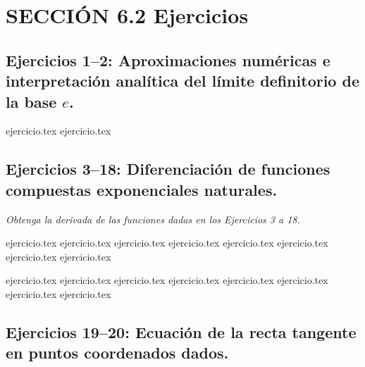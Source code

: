 
\section*{SECCIÓN 6.2 \quad Ejercicios}

\subsection*{Ejercicios 1--2: Aproximaciones numéricas e interpretación analítica del límite definitorio de la base $e$.}

\begin{enumerate}
    {ejercicio.tex}
    {ejercicio.tex}
\end{enumerate}

\subsection*{Ejercicios 3--18: Diferenciación de funciones compuestas exponenciales naturales.}

\noindent \textit{Obtenga la derivada de las funciones dadas en los Ejercicios 3 a 18.}

\begin{enumerate}
    \setcounter{enumi}{2}
    \begin{minipage}{0.45\textwidth}
    {ejercicio.tex}
    {ejercicio.tex}
    {ejercicio.tex}
    {ejercicio.tex}
    {ejercicio.tex}
    {ejercicio.tex}
    {ejercicio.tex}
    {ejercicio.tex}
    \end{minipage}%
    \begin{minipage}{0.45\textwidth}
    {ejercicio.tex}
    {ejercicio.tex}
    {ejercicio.tex}
    {ejercicio.tex}
    {ejercicio.tex}
    {ejercicio.tex}
    {ejercicio.tex}
    {ejercicio.tex}
    \end{minipage}
\end{enumerate}

\subsection*{Ejercicios 19--20: Ecuación de la recta tangente en puntos coordenados dados.}

